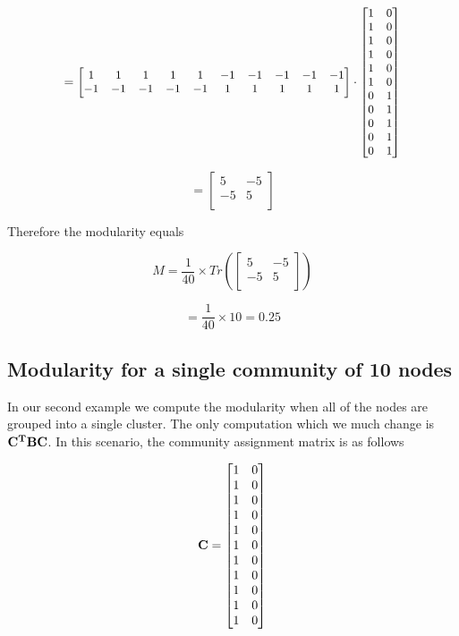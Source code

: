 \documentclass[a4paper,12pt]{article}
\begin{document}
		\[\small =\begin{bmatrix}
		1&  1&  1&  1&  1& -1& -1& -1& -1& -1 \\
	   -1& -1& -1& -1& -1&  1&  1&  1&  1&  1 \\
	\end{bmatrix} \cdot 
	\begin{bmatrix}
		1 & 0 \\ 
		1 & 0 \\
		1 & 0 \\
		1 & 0 \\ 
		1 & 0 \\ 
		1 & 0 \\ 
		0 & 1 \\ 
		0 & 1 \\ 
		0 & 1 \\ 
		0 & 1 \\ 
		0 & 1 
	\end{bmatrix}\]
	
	
	\[ =\begin{bmatrix}
		5 & -5 \\
		-5 & 5 \\
	\end{bmatrix} \]
	
	Therefore the modularity equals 
	
	\[ M = \frac{1}{40} \times Tr\left( \begin{bmatrix}
		5 & -5 \\
		-5 & 5 \\
	\end{bmatrix} \right) \]
	
	\[ = \frac{1}{40} \times 10 = 0.25\]
	
	\subsection*{Modularity for a single community of 10 nodes}
	In our second example we compute the modularity when all of the nodes are grouped into a single cluster. The only computation which we much change is ${\bf C^T B C}$. In this scenario, the community assignment matrix is as follows
	
	\[ {\bf C} = \begin{bmatrix}1 & 0 \\ 1 & 0 \\ 1 & 0 \\ 1 & 0 \\ 1 & 0 \\ 1 & 0 \\ 1 & 0 \\ 1 & 0 \\ 1 & 0 \\ 1 & 0 \\ 1 & 0 \\
	\end{bmatrix}\] 
	
\end{document}
